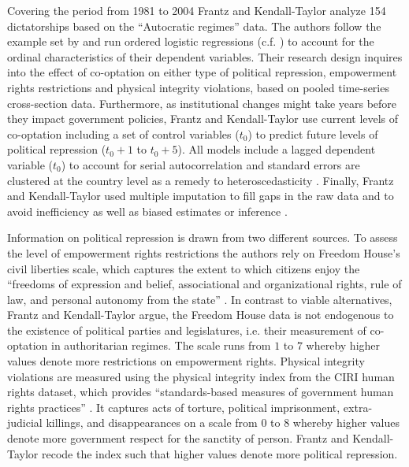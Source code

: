Covering the period from 1981 to 2004 Frantz and 
Kendall-Taylor analyze 154 dictatorships based on the 
``Autocratic regimes'' data. The authors follow the example
set by \citet{Vreeland.2008} and run ordered logistic
regressions (c.f. \cite{Fox.2008,Fox.2011}) to account for
the ordinal characteristics of their dependent variables.
Their research design inquires into the effect of 
co-optation on either type of political repression, 
empowerment rights restrictions and physical integrity 
violations, based on pooled time-series cross-section data.
Furthermore, as institutional changes might take 
years before they impact government policies, Frantz and 
Kendall-Taylor use current levels of co-optation including
a set of control variables ($t_0$) to predict future levels 
of political repression ($t_0+1$ to $t_0+5$). All models 
include a lagged dependent variable ($t_0$) to account for 
serial autocorrelation and standard errors are clustered at 
the country level as a remedy to heteroscedasticity 
\citep{Beck.1995}. Finally, Frantz and Kendall-Taylor used
multiple imputation to fill gaps in the raw data and to 
avoid inefficiency as well as biased estimates or inference 
\citep{King.2001b,Honaker.2010,Honaker.2011}.

Information on political repression is drawn from two 
different sources. To assess the level of empowerment 
rights restrictions the authors rely on Freedom House's 
civil liberties scale, which captures the extent to which citizens enjoy the ``freedoms of expression and belief, 
associational and organizational rights, rule of law, and 
personal autonomy from the state'' 
\citep{FreedomHouse.2010}. In contrast to viable 
alternatives, Frantz and Kendall-Taylor argue, the Freedom 
House data is not endogenous to the existence of political 
parties and legislatures, i.e. their measurement of 
co-optation in authoritarian regimes. The scale runs from 
$1$ to $7$ whereby higher values denote more restrictions on
empowerment rights. Physical integrity violations are 
measured using the physical integrity index from the CIRI
human rights dataset, which provides ``standards-based 
measures of government human rights practices'' 
\citep[402]{Cingranelli.2010b}. It captures acts of torture,
political imprisonment, extra-judicial killings, and 
disappearances on a scale from $0$ to $8$ whereby higher 
values denote more government respect for the sanctity of 
person. Frantz and Kendall-Taylor recode the index such that
higher values denote more political repression.


